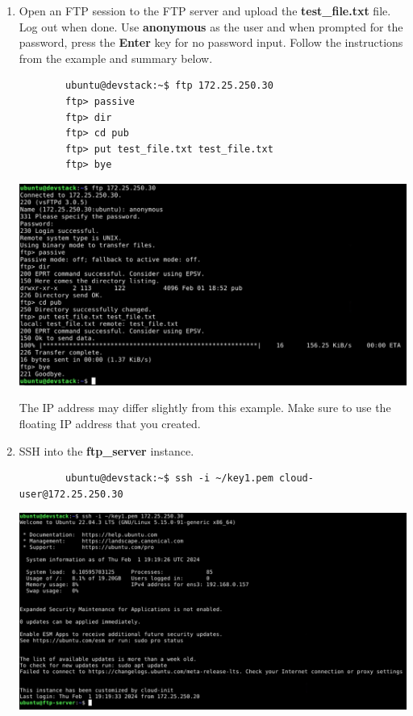 \documentclass[letterpaper, 12pt]{article}
\begin{document}
\begin{enumerate}
    \item Open an FTP session to the FTP server and upload the \textbf{test\_file.txt} file. Log out when done. Use
    \textbf{anonymous} as the user and when prompted for the password, press the \textbf{Enter} key for no password
    input. Follow the instructions from the example and summary below.
    \begin{lstlisting}
        ubuntu@devstack:~$ ftp 172.25.250.30
        ftp> passive
        ftp> dir
        ftp> cd pub
        ftp> put test_file.txt test_file.txt
        ftp> bye
    \end{lstlisting}

    \begin{center}
        \includegraphics[width=\linewidth]{images/part1/step50.png}
    \end{center}

    \begin{notebox}
        The IP address may differ slightly from this example. Make sure to use the floating IP address that you created.
    \end{notebox}

    \item SSH into the \textbf{ftp\_server} instance.
    \begin{lstlisting}
        ubuntu@devstack:~$ ssh -i ~/key1.pem cloud-user@172.25.250.30
    \end{lstlisting}

    \begin{center}
        \includegraphics[width=\linewidth]{images/part1/step51.png}
    \end{center}


\end{enumerate}
\end{document}
